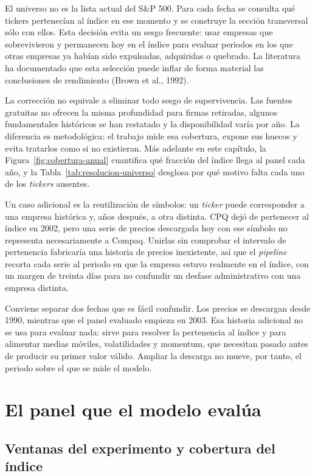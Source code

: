 El universo no es la lista actual del S\&P 500. Para cada fecha se consulta qué tickers pertenecían
al índice en ese momento y se construye la sección transversal sólo con ellos. Esta decisión evita
un sesgo frecuente: usar empresas que sobrevivieron y permanecen hoy en el índice para evaluar
periodos en los que otras empresas ya habían sido expulsadas, adquiridas o quebrado. La literatura
ha documentado que esta selección puede inflar de forma material las conclusiones de rendimiento
(Brown et al., 1992).

La corrección no equivale a eliminar todo sesgo de supervivencia. Las fuentes gratuitas no ofrecen la
misma profundidad para firmas retiradas, algunos fundamentales históricos se han restatado y la
disponibilidad varía por año. La diferencia es metodológica: el trabajo mide esa cobertura, expone
sus huecos y evita tratarlos como si no existieran. Más adelante en este capítulo, la
Figura~\ref{fig:cobertura-anual} cuantifica qué fracción del índice llega al panel cada año, y la
Tabla~\ref{tab:resolucion-universo} desglosa por qué motivo falta cada uno de los \textit{tickers}
ausentes.

Un caso adicional es la reutilización de símbolos: un \textit{ticker} puede corresponder a una
empresa histórica y, años después, a otra distinta. CPQ dejó de pertenecer al índice en 2002, pero
una serie de precios descargada hoy con ese símbolo no representa necesariamente a Compaq. Unirlas
sin comprobar el intervalo de pertenencia fabricaría una historia de precios inexistente, así que el
\textit{pipeline} recorta cada serie al periodo en que la empresa estuvo realmente en el índice, con
un margen de treinta días para no confundir un desfase administrativo con una empresa distinta.

Conviene separar dos fechas que es fácil confundir. Los precios se descargan desde 1990, mientras
que el panel evaluado empieza en 2003. Esa historia adicional no se usa para evaluar nada: sirve
para resolver la pertenencia al índice y para alimentar medias móviles, volatilidades y momentum,
que necesitan pasado antes de producir su primer valor válido. Ampliar la descarga no mueve, por
tanto, el periodo sobre el que se mide el modelo.

\section{El panel que el modelo evalúa}

\subsection{Ventanas del experimento y cobertura del índice}

